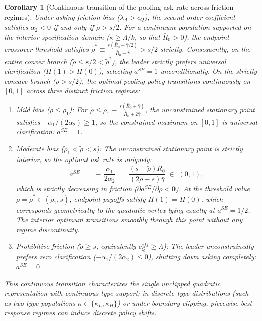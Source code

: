 \documentclass[11pt]{article}
\newtheorem{corollary}{Corollary}
\begin{document}
\begin{corollary}[Continuous transition of the pooling ask rate across friction regimes]
\label{cor:continuous-trans}
Under asking friction bias ($\lambda_A > c_Q$), the second-order coefficient satisfies $\alpha_2 < 0$ if and only if $\tilde\rho > s/2$.
For a continuum population supported on the interior specification domain ($\kappa \ge \Lambda/k$, so that $\bar R_0 > 0$), the endpoint crossover threshold satisfies $\tilde\rho^* \equiv \frac{s(\bar R_0 + \bar\gamma/2)}{\bar R_0 + \bar\gamma} > s/2$ strictly. Consequently, on the entire convex branch ($\tilde\rho \le s/2 < \tilde\rho^*$), the leader strictly prefers universal clarification ($\Pi(1) > \Pi(0)$), selecting $a^{SE} = 1$ unconditionally.
On the strictly concave branch ($\tilde\rho > s/2$), the optimal pooling policy transitions continuously on $[0, 1]$ across three distinct friction regimes:
\begin{enumerate}[leftmargin=*]
\item \emph{Mild bias ($\tilde\rho \le \tilde\rho_1$):} For $\tilde\rho \le \tilde\rho_1 \equiv \frac{s(\bar R_0 + \bar\gamma)}{\bar R_0 + 2\bar\gamma}$, the unconstrained stationary point satisfies $-\alpha_1/(2\alpha_2) \ge 1$, so the constrained maximum on $[0, 1]$ is universal clarification: $a^{SE} = 1$.
\item \emph{Moderate bias ($\tilde\rho_1 < \tilde\rho < s$):} The unconstrained stationary point is strictly interior, so the optimal ask rate is uniquely:
\[
a^{SE} \;=\; -\,\frac{\alpha_1}{2\alpha_2} \;=\; \frac{(s - \tilde\rho)\bar R_0}{(2\tilde\rho - s)\bar\gamma} \;\in\; (0, 1),
\]
which is strictly decreasing in friction ($\partial a^{SE}/\partial\tilde\rho < 0$). At the threshold value $\tilde\rho = \tilde\rho^* \in (\tilde\rho_1, s)$, endpoint payoffs satisfy $\Pi(1) = \Pi(0)$, which corresponds geometrically to the quadratic vertex lying exactly at $a^{SE} = 1/2$. The interior optimum transitions smoothly through this point without any regime discontinuity.
\item \emph{Prohibitive friction ($\tilde\rho \ge s$, equivalently $c_Q^{eff} \ge \Lambda$):} The leader unconstrainedly prefers zero clarification ($-\alpha_1/(2\alpha_2) \le 0$), shutting down asking completely: $a^{SE} = 0$.
\end{enumerate}
This continuous transition characterizes the single unclipped quadratic representation with continuous type support; in discrete type distributions (such as two-type populations $\kappa \in \{\kappa_L, \kappa_H\}$) or under boundary clipping, piecewise best-response regimes can induce discrete policy shifts.
\end{corollary}
\end{document}
